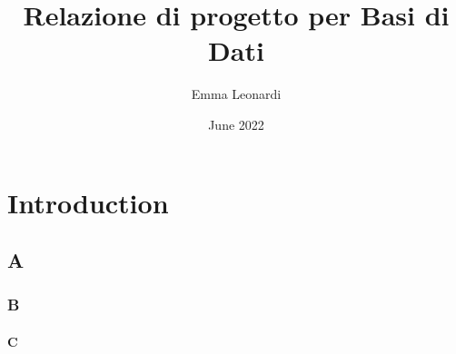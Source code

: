 \documentclass{article}
\title{Relazione di progetto per Basi di Dati}
\author{Emma Leonardi}
\date{June 2022}
\begin{document}
\maketitle

\section{Introduction}
\subsection{A}
\subsubsection{B}
\paragraph{C}
\end{document}
